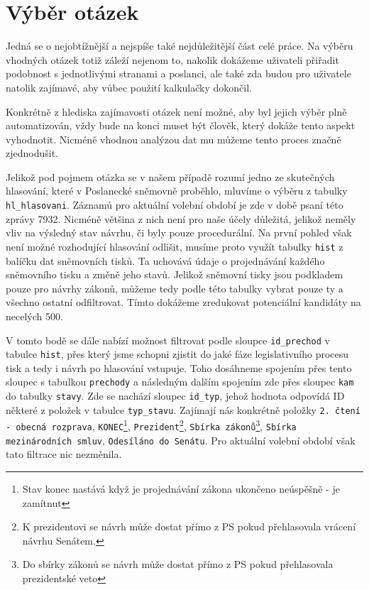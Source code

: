 
\section{Výběr otázek}
Jedná se o nejobtížnější a nejspíše také nejdůležitější část celé práce. Na výběru vhodných otázek totiž záleží nejenom to, nakolik dokážeme uživateli přiřadit podobnost s jednotlivými stranami a poslanci, ale také zda budou pro uživatele natolik zajímavé, aby vůbec použití kalkulačky dokončil.
\par Konkrétně z hlediska zajímavosti otázek není možné, aby byl jejich výběr plně automatizován, vždy bude na konci muset být člověk, který dokáže tento aspekt vyhodnotit. Nicméně vhodnou analýzou dat mu můžeme tento proces značně zjednodušit.
\par Jelikož pod pojmem otázka se v našem případě rozumí jedno ze skutečných hlasování, které v Poslanecké sněmovně proběhlo, mluvíme o výběru z tabulky \texttt{hl\_hlasovani}. Záznamů pro aktuální volební období je zde v době psaní této zprávy 7932. Nicméně většina z nich není pro naše účely důležitá, jelikož neměly vliv na výsledný stav návrhu, či byly pouze procedurální. Na první pohled však není možné rozhodující hlasování odlišit, musíme proto využít tabulky \texttt{hist} z balíčku dat sněmovních tisků. Ta uchovává údaje o projednávání každého sněmovního tisku a změně jeho stavů. Jelikož sněmovní tisky jsou podkladem pouze pro návrhy zákonů, můžeme tedy podle této tabulky vybrat pouze ty a všechno ostatní odfiltrovat. Tímto dokážeme zredukovat potenciální kandidáty na necelých 500.\\

\par V tomto bodě se dále nabízí možnost filtrovat podle sloupce \texttt{id\_prechod} v tabulce \texttt{hist}, přes který jsme schopni zjistit do jaké fáze legislativního procesu tisk a tedy i návrh po hlasování vstupuje. Toho dosáhneme spojením přes tento sloupec s tabulkou \texttt{prechody} a následným dalším spojením zde přes sloupec \texttt{kam} do tabulky \texttt{stavy}. Zde se nachází sloupec \texttt{id\_typ}, jehož hodnota odpovídá ID některé z položek v tabulce \texttt{typ\_stavu}. Zajímají nás konkrétně položky \texttt{2. čtení - obecná rozprava}, \texttt{KONEC}\footnote{Stav konec nastává když je projednávání zákona ukončeno neúspěšně - je zamítnut}, \texttt{Prezident}\footnote{K prezidentovi se návrh může dostat přímo z PS pokud přehlasovala vrácení návrhu Senátem.}, \texttt{Sbírka zákonů}\footnote{Do sbírky zákonů se návrh může dostat přímo z PS pokud přehlasovala prezidentské veto}, \texttt{Sbírka mezinárodních smluv}, \texttt{Odesíláno do Senátu}. Pro aktuální volební období však tato filtrace nic nezměnila.\\

